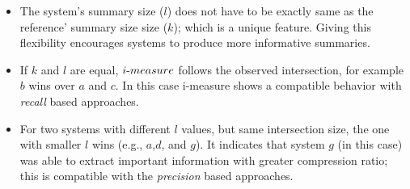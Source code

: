 \documentclass[a4paper]{report}
\begin{document}
\begin{itemize}[nolistsep, noitemsep]
\item The system's summary size ($l$) does not have to be exactly same as the reference' summary size size ($k$); which is a unique feature. Giving this flexibility encourages systems to produce more informative summaries.
\item If $k$ and $l$ are equal, $i\hbox{-}measure$ follows the observed intersection, for example $b$ wins over $a$ and $c$. In this case i\hbox{-}measure shows a compatible behavior with \emph{recall} based approaches.
\item For two systems with different $l$ values, but same intersection size, the one with smaller $l$ wins (e.g., $a$,$d$, and $g$). It indicates that system $g$ (in this case) was able to extract important information with greater compression ratio; this is compatible with the \emph{precision} based approaches.
\end{itemize}
\end{document}

